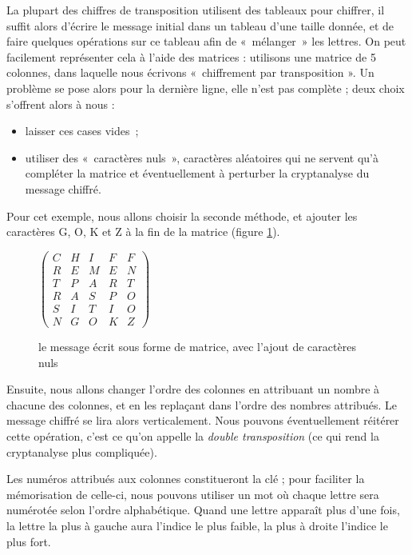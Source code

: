 La plupart des chiffres de transposition utilisent des tableaux pour
chiffrer, il suffit alors d'écrire le message initial dans un tableau
d'une taille donnée, et de faire quelques opérations sur ce tableau
afin de «~mélanger~» les lettres. On peut facilement représenter cela
à l'aide des matrices : utilisons une matrice de 5
colonnes, dans laquelle nous écrivons «~chiffrement par transposition
». Un problème se pose alors pour la dernière ligne, elle n'est pas
complète ; deux choix s'offrent alors à nous : 
\begin{itemize}
  \item laisser ces cases vides~;
  \item utiliser des «~caractères nuls~», caractères aléatoires qui ne
    servent qu'à compléter la matrice et éventuellement à perturber la
    cryptanalyse du message chiffré.
\end{itemize}
Pour cet exemple, nous allons choisir la seconde méthode, et ajouter
les caractères G, O, K et Z à la fin de la matrice (figure
\ref{fig:TranspositionMatriceNul}).
\begin{figure}[h]
  \begin{center}
  $
  \left(
    \begin{array}{ccccc}
      C & H & I & F & F \\
      R & E & M & E & N \\
      T & P & A & R & T \\
      R & A & S & P & O \\
      S & I & T & I & O \\
      N & G & O & K & Z 
    \end{array}
  \right)
  $
  \end{center}
  \caption{le message écrit sous forme de matrice, avec l'ajout de
    caractères nuls}
  \label{fig:TranspositionMatriceNul}
\end{figure}

Ensuite, nous allons changer l'ordre des colonnes en attribuant un
nombre à chacune des colonnes, et en les replaçant dans l'ordre des
nombres attribués. Le message chiffré se lira alors verticalement.
Nous pouvons éventuellement réitérer cette opération, c'est ce qu'on
appelle la \emph{double transposition} (ce qui rend la cryptanalyse plus
compliquée).

Les numéros attribués aux colonnes constitueront la clé ; pour
faciliter la mémorisation de celle-ci, nous pouvons utiliser un mot
où chaque lettre sera numérotée selon l'ordre alphabétique. Quand une
lettre apparaît plus d'une fois, la lettre la plus à gauche aura
l'indice le plus faible, la plus à droite l'indice le plus fort.

